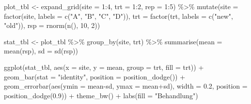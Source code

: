 \documentclass[
  letterpaper,
]{scrbook}
\newenvironment{Shaded}{\begin{snugshade}}{\end{snugshade}}
\newcommand{\AttributeTok}[1]{\textcolor[rgb]{0.40,0.45,0.13}{#1}}
\newcommand{\DecValTok}[1]{\textcolor[rgb]{0.68,0.00,0.00}{#1}}
\newcommand{\FloatTok}[1]{\textcolor[rgb]{0.68,0.00,0.00}{#1}}
\newcommand{\FunctionTok}[1]{\textcolor[rgb]{0.28,0.35,0.67}{#1}}
\newcommand{\NormalTok}[1]{\textcolor[rgb]{0.00,0.23,0.31}{#1}}
\newcommand{\OtherTok}[1]{\textcolor[rgb]{0.00,0.23,0.31}{#1}}
\newcommand{\SpecialCharTok}[1]{\textcolor[rgb]{0.37,0.37,0.37}{#1}}
\newcommand{\StringTok}[1]{\textcolor[rgb]{0.13,0.47,0.30}{#1}}
\begin{document}
\begin{Shaded}
\begin{Highlighting}[]
\NormalTok{plot\_tbl }\OtherTok{\textless{}{-}} \FunctionTok{expand\_grid}\NormalTok{(}\AttributeTok{site =} \DecValTok{1}\SpecialCharTok{:}\DecValTok{4}\NormalTok{, }
                        \AttributeTok{trt =} \DecValTok{1}\SpecialCharTok{:}\DecValTok{2}\NormalTok{, }
                        \AttributeTok{rep =} \DecValTok{1}\SpecialCharTok{:}\DecValTok{5}\NormalTok{) }\SpecialCharTok{\%\textgreater{}\%} 
  \FunctionTok{mutate}\NormalTok{(}\AttributeTok{site =} \FunctionTok{factor}\NormalTok{(site, }\AttributeTok{labels =} \FunctionTok{c}\NormalTok{(}\StringTok{"A"}\NormalTok{, }\StringTok{"B"}\NormalTok{, }\StringTok{"C"}\NormalTok{, }\StringTok{"D"}\NormalTok{)),}
         \AttributeTok{trt =} \FunctionTok{factor}\NormalTok{(trt, }\AttributeTok{labels =} \FunctionTok{c}\NormalTok{(}\StringTok{"new"}\NormalTok{, }\StringTok{"old"}\NormalTok{)),}
         \AttributeTok{rsp =} \FunctionTok{rnorm}\NormalTok{(}\FunctionTok{n}\NormalTok{(), }\DecValTok{10}\NormalTok{, }\DecValTok{2}\NormalTok{))}

\NormalTok{stat\_tbl }\OtherTok{\textless{}{-}}\NormalTok{ plot\_tbl }\SpecialCharTok{\%\textgreater{}\%} 
  \FunctionTok{group\_by}\NormalTok{(site, trt) }\SpecialCharTok{\%\textgreater{}\%} 
  \FunctionTok{summarise}\NormalTok{(}\AttributeTok{mean =} \FunctionTok{mean}\NormalTok{(rsp),}
            \AttributeTok{sd =} \FunctionTok{sd}\NormalTok{(rsp))}

\FunctionTok{ggplot}\NormalTok{(stat\_tbl, }\FunctionTok{aes}\NormalTok{(}\AttributeTok{x =}\NormalTok{ site, }\AttributeTok{y =}\NormalTok{ mean, }\AttributeTok{group =}\NormalTok{ trt, }\AttributeTok{fill =}\NormalTok{ trt)) }\SpecialCharTok{+} 
  \FunctionTok{geom\_bar}\NormalTok{(}\AttributeTok{stat =} \StringTok{"identity"}\NormalTok{, }\AttributeTok{position =} \FunctionTok{position\_dodge}\NormalTok{()) }\SpecialCharTok{+}
  \FunctionTok{geom\_errorbar}\NormalTok{(}\FunctionTok{aes}\NormalTok{(}\AttributeTok{ymin =}\NormalTok{ mean}\SpecialCharTok{{-}}\NormalTok{sd, }\AttributeTok{ymax =}\NormalTok{ mean}\SpecialCharTok{+}\NormalTok{sd),}
                \AttributeTok{width =} \FloatTok{0.2}\NormalTok{, }\AttributeTok{position =} \FunctionTok{position\_dodge}\NormalTok{(}\FloatTok{0.9}\NormalTok{)) }\SpecialCharTok{+}
  \FunctionTok{theme\_bw}\NormalTok{() }\SpecialCharTok{+}
  \FunctionTok{labs}\NormalTok{(}\AttributeTok{fill =} \StringTok{"Behandlung"}\NormalTok{)}
\end{Highlighting}
\end{Shaded}
\end{document}
